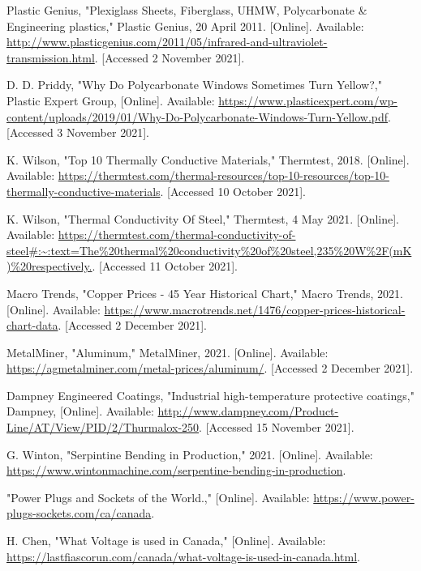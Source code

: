 \documentclass{ucalgarythesis}
\begin{document}
\begin{thebibliography}{9}
     Plastic Genius, "Plexiglass Sheets, Fiberglass, UHMW, Polycarbonate \& Engineering plastics," Plastic Genius, 20 April 2011. [Online]. Available: \url{http://www.plasticgenius.com/2011/05/infrared-and-ultraviolet-transmission.html}. [Accessed 2 November 2021].
    
     D. D. Priddy, "Why Do Polycarbonate Windows Sometimes Turn Yellow?," Plastic Expert Group, [Online]. Available: \url{https://www.plasticexpert.com/wp-content/uploads/2019/01/Why-Do-Polycarbonate-Windows-Turn-Yellow.pdf}. [Accessed 3 November 2021].
    
     K. Wilson, "Top 10 Thermally Conductive Materials," Thermtest, 2018. [Online]. Available: \url{https://thermtest.com/thermal-resources/top-10-resources/top-10-thermally-conductive-materials}. [Accessed 10 October 2021].
    
     K. Wilson, "Thermal Conductivity Of Steel," Thermtest, 4 May 2021. [Online]. Available: \url{https://thermtest.com/thermal-conductivity-of-steel#:~:text=The\%20thermal\%20conductivity\%20of\%20steel,235\%20W\%2F(mK)\%20respectively.}. [Accessed 11 October 2021].
    
     Macro Trends, "Copper Prices - 45 Year Historical Chart," Macro Trends, 2021. [Online]. Available: \url{https://www.macrotrends.net/1476/copper-prices-historical-chart-data}. [Accessed 2 December 2021].
    
     MetalMiner, "Aluminum," MetalMiner, 2021. [Online]. Available: \url{https://agmetalminer.com/metal-prices/aluminum/}. [Accessed 2 December 2021].
    
     Dampney Engineered Coatings, "Industrial high-temperature protective coatings," Dampney, [Online]. Available: \url{http://www.dampney.com/Product-Line/AT/View/PID/2/Thurmalox-250}. [Accessed 15 November 2021].
    
     G. Winton, "Serpintine Bending in Production," 2021. [Online]. Available: \url{https://www.wintonmachine.com/serpentine-bending-in-production}.
    
     "Power Plugs and Sockets of the World.," [Online]. Available: \url{https://www.power-plugs-sockets.com/ca/canada}.
    
     H. Chen, "What Voltage is used in Canada," [Online]. Available: \url{https://lastfiascorun.com/canada/what-voltage-is-used-in-canada.html}.
   

\end{thebibliography}
\end{document}
